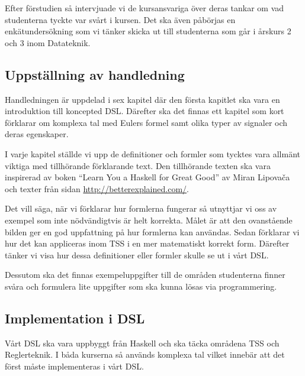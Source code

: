 \documentclass[]{article}
\begin{document}
Efter förstudien så intervjuade vi de kursansvariga över deras tankar om vad
studenterna tyckte var svårt i kursen. Det ska även påbörjas en enkätundersökning
som vi tänker skicka ut till studenterna som går i årskurs 2 och 3 inom Datateknik.


\subsection{Uppställning av handledning}


Handledningen är uppdelad i sex kapitel %
där den första kapitlet ska vara en introduktion till koncepted DSL. Därefter ska det finnas
ett kapitel som kort förklarar om komplexa tal med Eulers formel samt olika typer av
signaler och deras egenskaper.


I varje kapitel ställde vi upp de definitioner och formler som tycktes
vara allmänt viktiga med tillhörande förklarande text. Den tillhörande
texten ska vara inspirerad av boken ``Learn You a Haskell for Great
Good'' av Miran Lipovača \cite{learnyouahaskell} och texter från sidan
\url{http://betterexplained.com/}.

Det vill säga, när vi förklarar hur formlerna fungerar så utnyttjar vi
oss av exempel som inte nödvändigtvis är helt korrekta. Målet är
att den ovanstående bilden ger en god uppfattning på hur formlerna kan användas.
Sedan förklarar vi hur det kan appliceras inom TSS i en mer matematiskt korrekt form.
Därefter tänker vi visa hur dessa definitioner eller formler skulle se ut i vårt DSL.

Dessutom ska det finnas exempeluppgifter till de områden studenterna finner
svåra och formulera lite uppgifter som ska kunna lösas via programmering.

\subsection{Implementation i DSL}

Vårt DSL ska vara uppbyggt från Haskell och ska täcka områdena TSS och Reglerteknik.
I båda kurserna så används komplexa tal vilket innebär att det först måste implementeras i vårt DSL.
\end{document}
